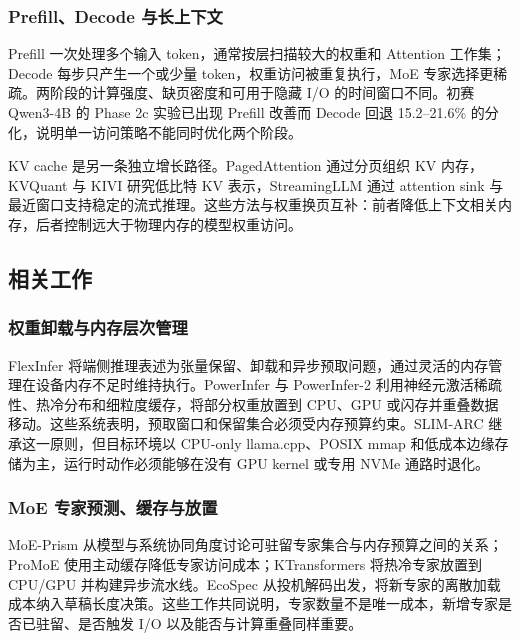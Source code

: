 \subsubsection{Prefill、Decode 与长上下文}

Prefill 一次处理多个输入 token，通常按层扫描较大的权重和 Attention 工作集；Decode 每步只产生一个或少量 token，权重访问被重复执行，MoE 专家选择更稀疏。两阶段的计算强度、缺页密度和可用于隐藏 I/O 的时间窗口不同。初赛 Qwen3-4B 的 Phase 2c 实验已出现 Prefill 改善而 Decode 回退 15.2--21.6\% 的分化，说明单一访问策略不能同时优化两个阶段。

KV cache 是另一条独立增长路径。PagedAttention 通过分页组织 KV 内存\cite{pagedattention2023}，KVQuant 与 KIVI 研究低比特 KV 表示\cite{kvquant2024,kivi2024}，StreamingLLM 通过 attention sink 与最近窗口支持稳定的流式推理\cite{streamingllm2024}。这些方法与权重换页互补：前者降低上下文相关内存，后者控制远大于物理内存的模型权重访问。

\subsection{相关工作}

\subsubsection{权重卸载与内存层次管理}

FlexInfer 将端侧推理表述为张量保留、卸载和异步预取问题，通过灵活的内存管理在设备内存不足时维持执行\cite{flexinfer2025}。PowerInfer 与 PowerInfer-2 利用神经元激活稀疏性、热冷分布和细粒度缓存，将部分权重放置到 CPU、GPU 或闪存并重叠数据移动\cite{powerinfer2024,powerinfer2_2024}。这些系统表明，预取窗口和保留集合必须受内存预算约束。SLIM-ARC 继承这一原则，但目标环境以 CPU-only llama.cpp、POSIX mmap 和低成本边缘存储为主，运行时动作必须能够在没有 GPU kernel 或专用 NVMe 通路时退化。

\subsubsection{MoE 专家预测、缓存与放置}

MoE-Prism 从模型与系统协同角度讨论可驻留专家集合与内存预算之间的关系\cite{moeprism2025}；ProMoE 使用主动缓存降低专家访问成本\cite{promoe2025}；KTransformers 将热冷专家放置到 CPU/GPU 并构建异步流水线\cite{ktransformers2025}。EcoSpec 从投机解码出发，将新专家的离散加载成本纳入草稿长度决策\cite{ecospec2026}。这些工作共同说明，专家数量不是唯一成本，新增专家是否已驻留、是否触发 I/O 以及能否与计算重叠同样重要。

